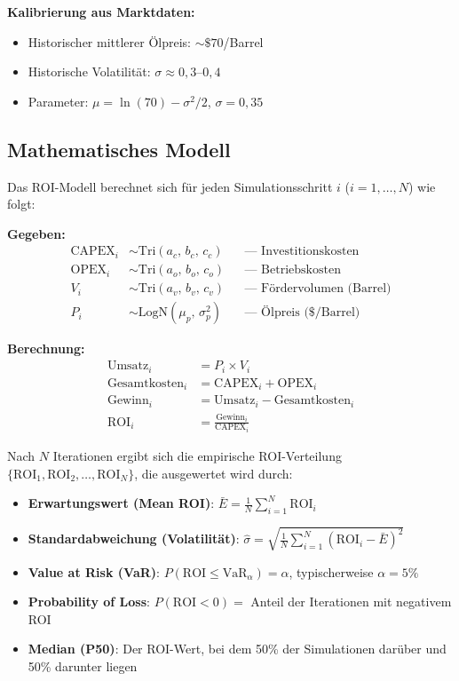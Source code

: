 \documentclass[11pt,a4paper]{article}
\begin{document}
\textbf{Kalibrierung aus Marktdaten:}
\begin{itemize}[itemsep=1pt]
  \item Historischer mittlerer Ölpreis: ${\sim}\$70$/Barrel
  \item Historische Volatilität: $\sigma \approx 0{,}3$–$0{,}4$
  \item Parameter: $\mu = \ln(70) - \sigma^2/2$, \; $\sigma = 0{,}35$
\end{itemize}

\subsection{Mathematisches Modell}

Das ROI-Modell berechnet sich für jeden Simulationsschritt $i$ ($i = 1, \dots, N$) wie folgt:

\textbf{Gegeben:}
\begin{align}
  \text{CAPEX}_i &\sim \text{Tri}(a_c,\, b_c,\, c_c)  & &\text{— Investitionskosten} \\
  \text{OPEX}_i  &\sim \text{Tri}(a_o,\, b_o,\, c_o)  & &\text{— Betriebskosten} \\
  V_i            &\sim \text{Tri}(a_v,\, b_v,\, c_v)  & &\text{— Fördervolumen (Barrel)} \\
  P_i            &\sim \text{LogN}(\mu_p,\, \sigma_p^2) & &\text{— Ölpreis (\$/Barrel)}
\end{align}

\textbf{Berechnung:}
\begin{align}
  \text{Umsatz}_i       &= P_i \times V_i \\
  \text{Gesamtkosten}_i &= \text{CAPEX}_i + \text{OPEX}_i \\
  \text{Gewinn}_i       &= \text{Umsatz}_i - \text{Gesamtkosten}_i \\
  \text{ROI}_i          &= \frac{\text{Gewinn}_i}{\text{CAPEX}_i}
\end{align}

Nach $N$ Iterationen ergibt sich die empirische ROI-Verteilung $\{\text{ROI}_1, \text{ROI}_2, \dots, \text{ROI}_N\}$, die ausgewertet wird durch:

\begin{itemize}[itemsep=2pt]
  \item \textbf{Erwartungswert (Mean ROI)}: $\bar{E} = \frac{1}{N}\sum_{i=1}^{N} \text{ROI}_i$
  \item \textbf{Standardabweichung (Volatilität)}: $\hat{\sigma} = \sqrt{\frac{1}{N}\sum_{i=1}^{N}(\text{ROI}_i - \bar{E})^2}$
  \item \textbf{Value at Risk (VaR)}: $P(\text{ROI} \leq \text{VaR}_\alpha) = \alpha$, typischerweise $\alpha = 5\%$
  \item \textbf{Probability of Loss}: $P(\text{ROI} < 0) = $ Anteil der Iterationen mit negativem ROI
  \item \textbf{Median (P50)}: Der ROI-Wert, bei dem 50\% der Simulationen darüber und 50\% darunter liegen
\end{itemize}
\end{document}
